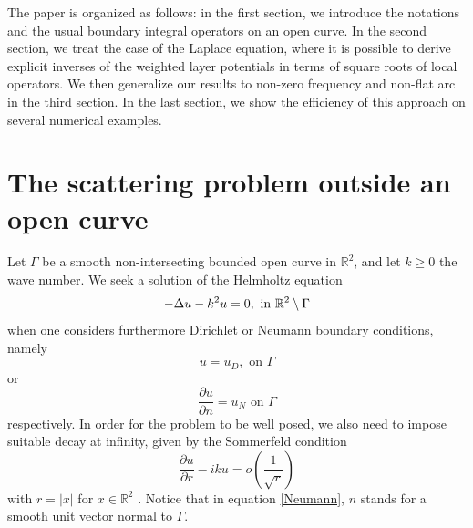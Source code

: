 \documentclass[a4paper]{subfiles}
\begin{document}
The paper is organized as follows: in the first section, we introduce the notations and the usual boundary integral operators on an open curve. 
In the second section, we treat the case of the Laplace equation, where it is possible to derive explicit inverses of the weighted layer potentials 
in terms of square roots of local operators. We then generalize our results to non-zero frequency and non-flat arc in the third section. In the last 
section, we show the efficiency of this approach on several numerical examples. 


\section{The scattering problem outside an open curve}

Let $\Gamma$ be a smooth non-intersecting bounded open curve in $\mathbb{R}^2$, and let $k \geq 0$ the wave number. We seek a solution 
of the Helmholtz equation
\begin{equation}
	-\Delta u - k^2 u = 0,  \text{ in } \mathbb{R}^2 \setminus \Gamma
	\label{Helmholtz}
\end{equation}
when one considers furthermore Dirichlet or Neumann boundary conditions, namely
\begin{equation}
	u = u_D, \text{ on } \Gamma
\label{Dirichlet}
\end{equation}
or
\begin{equation} 
	\dfrac{\partial u}{\partial n} = u_N  \text{ on } \Gamma 
\label{Neumann}
\end{equation}
respectively. In order for the problem to be well posed, we also need to impose suitable decay at infinity, given by the Sommerfeld condition
\begin{equation}
	\dfrac{\partial u}{\partial r} - iku = o\left(\frac{1}{\sqrt{r}}\right)
\label{Sommerfeld}
\end{equation}
with $r=|x|$ for $x\in \mathbb{R}^2$ .
Notice that in equation \eqref{Neumann}, $n$ stands for a smooth unit vector normal to $\Gamma$. 
\end{document}
